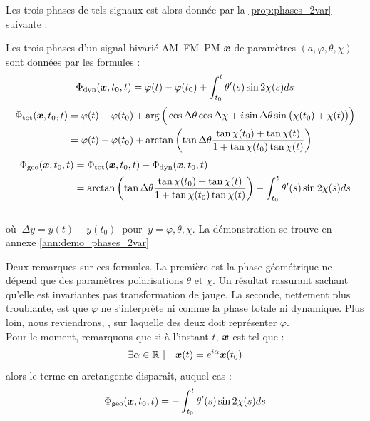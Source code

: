 Les trois phases de tels signaux est alors donnée par la \cref{prop:phases_2var} suivante :
\begin{proposition}\label{prop:phases_2var}
	Les trois phases d'un signal bivarié AM--FM--PM $\bf{x}$ de paramètres $(a,\varphi,\theta,\chi)$ sont données par les formules :
	\begin{equation}\label{eq:phased_2var}
		\phased(\bf{x}, t_0,t) = \varphi(t) -\varphi(t_0) + \int_{t_0}^t\theta'(s) \sin2\chi(s) ds
	\end{equation}
	\begin{equation}\label{eq:phaset_2var}
	\begin{aligned}
		\phaset(\bf{x},t_0,t) &= \varphi(t)-\varphi(t_0) + \arg\Big(\cos\Delta\theta \cos\Delta\chi + i\sin\Delta\theta \sin\big(\chi(t_0)+\chi(t)\big)\Big) \\
		&= \varphi(t)-\varphi(t_0) + \arctan\left(\tan\Delta\theta \frac{ \tan\chi(t_0)+\tan\chi(t)}{1 + \tan\chi(t_0)\tan\chi(t)}\right)
	\end{aligned}
	\end{equation}
	\begin{equation}\label{eq:phaseg_2var}
	\begin{aligned}
		\phaseg(\bf{x},t_0,t) &= \phaset(\bf{x},t_0,t) - \phased(\bf{x},t_0,t) \\
			&= \arctan\left(\tan\Delta\theta \frac{ \tan\chi(t_0)+\tan\chi(t)}{1 + \tan\chi(t_0)\tan\chi(t)}\right) - \int_{t_0}^t\theta'(s) \sin2\chi(s) ds
	\end{aligned}
	\end{equation}
	\\
	où $\ \Delta y = y(t) - y(t_0)\ $ pour $\ y=\varphi,\theta,\chi$. La démonstration se trouve en annexe \ref{ann:demo_phases_2var} 
\end{proposition}
\skipl

Deux remarques sur ces formules. 
La première est la phase géométrique ne dépend que des paramètres polarisations $\theta$ et $\chi$. 
Un résultat rassurant sachant qu'elle est invariantes pas transformation de jauge.
La seconde, nettement plus troublante, est que $\varphi$ ne s'interprète ni comme la phase totale ni dynamique. Plus loin, nous reviendrons, , sur laquelle des deux doit représenter $\varphi$.
\\

Pour le moment, remarquons que si à l'instant $t$, $\x$ est tel que :
\[\exists \alpha\in\R\ |\quad \x(t) = e^{i\alpha} \x(t_0)\]
alors le terme en arctangente disparaît, auquel cas :
\[\phaseg(\bf{x},t_0,t) = - \int_{t_0}^t\theta'(s) \sin2\chi(s) ds\]

